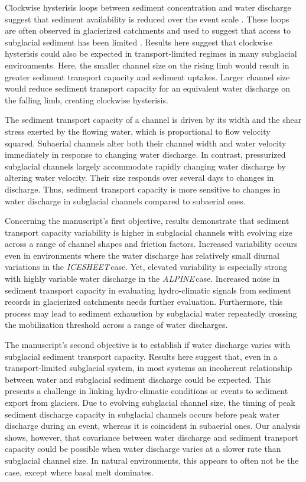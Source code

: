 \documentclass[esurf, manuscript]{copernicus}
\newcommand{\alpine}{\textit{ALPINE}\,}
\newcommand{\icesheet}{\textit{ICESHEET}\,}
\begin{document}
Clockwise hysterisis loops between sediment concentration and water discharge suggest that sediment availability is reduced over the event scale \citep[][]{williams1989}.
These loops are often observed in glacierized catchments and used to suggest that access to subglacial sediment has been limited \citep[e.g.][]{collins1979,willis1996,richards2003,stott2007,delaney2018}.
Results here suggest that clockwise hysterisis could also be expected in transport-limited regimes in many subglacial environments.
Here, the smaller channel size on the rising limb would result in greater sediment transport capacity and sediment uptakes.
Larger channel size would reduce sediment transport capacity for an equivalent water discharge on the falling limb, creating clockwise hysterisis. 

\conclusions

The sediment transport capacity of a channel is driven by its width and the shear stress exerted by the flowing water, which is proportional to flow velocity squared.
Subaerial channels alter both their channel width and water velocity immediately in response to changing water discharge.
In contrast, pressurized subglacial channels largely accommodate rapidly changing water discharge by altering water velocity.
Their size responds over several days to changes in discharge.
Thus, sediment transport capacity is  more sensitive to changes in water discharge in subglacial channels compared to subaerial ones.

Concerning the manuscript's first objective,
results demonstrate that sediment transport capacity variability is higher in subglacial channels with evolving size across a range of channel shapes and friction factors.
Increased variability occurs even in environments where the water discharge has relatively small diurnal variations in the \icesheet case.
Yet, elevated variability is especially strong with highly variable water discharge in the \alpine case.
Increased noise in sediment transport capacity in evaluating hydro-climatic signals from sediment records in glacierized catchments needs further evaluation.
Furthermore, this process may lead to sediment exhaustion by subglacial water repeatedly crossing the mobilization threshold across a range of water discharges. 

The manuscript's second objective is to establish if water discharge varies with subglacial sediment transport capacity.
Results here suggest that, even in a transport-limited subglacial system, in most systems an incoherent relationship between water and subglacial sediment discharge could be expected.
This presents a challenge in linking hydro-climatic conditions or events to sediment export from glaciers.
Due to evolving subglacial channel size, the timing of peak sediment discharge capacity in subglacial channels occurs before peak water discharge during an event, whereas it is coincident in subaerial ones.
Our analysis shows, however, that covariance between water discharge and sediment transport capacity could be possible when water discharge varies at a slower rate than subglacial channel size.
In natural environments, this appears to often not be the case, except where basal melt dominates.
\end{document}
